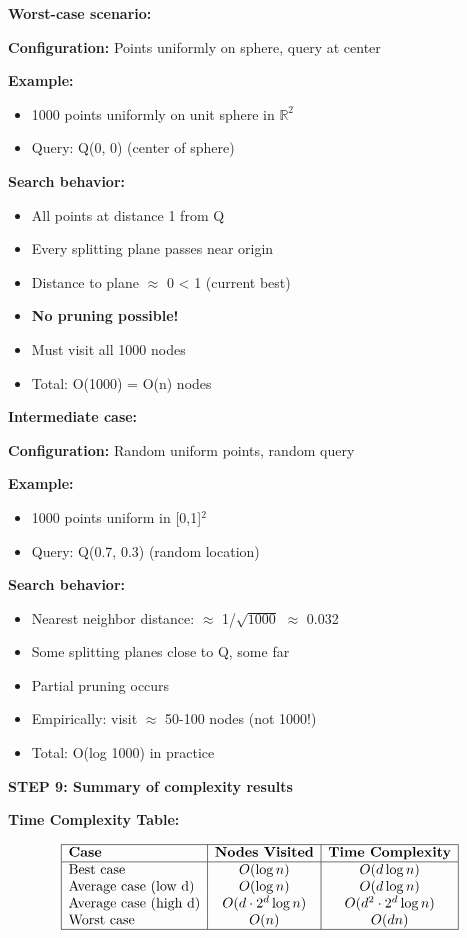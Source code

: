 \documentclass[12pt]{article}
\begin{document}
\begin{solution}
\textbf{Worst-case scenario:}

\textbf{Configuration:} Points uniformly on sphere, query at center

\textbf{Example:}
\begin{itemize}
    \item 1000 points uniformly on unit sphere in $\mathbb{R}^2$
    \item Query: Q(0, 0) (center of sphere)
\end{itemize}

\textbf{Search behavior:}
\begin{itemize}
    \item All points at distance 1 from Q
    \item Every splitting plane passes near origin
    \item Distance to plane $\approx$ 0 < 1 (current best)
    \item \textbf{No pruning possible!}
    \item Must visit all 1000 nodes
    \item Total: O(1000) = O(n) nodes \checkmark
\end{itemize}

\textbf{Intermediate case:}

\textbf{Configuration:} Random uniform points, random query

\textbf{Example:}
\begin{itemize}
    \item 1000 points uniform in [0,1]$^2$
    \item Query: Q(0.7, 0.3) (random location)
\end{itemize}

\textbf{Search behavior:}
\begin{itemize}
    \item Nearest neighbor distance: $\approx$ 1/$\sqrt{1000}$ $\approx$ 0.032
    \item Some splitting planes close to Q, some far
    \item Partial pruning occurs
    \item Empirically: visit $\approx$ 50-100 nodes (not 1000!)
    \item Total: O(log 1000) in practice \checkmark
\end{itemize}

\textbf{STEP 9: Summary of complexity results}

\textbf{Time Complexity Table:}

\[
\begin{array}{|l|c|c|}
\hline
\textbf{Case} & \textbf{Nodes Visited} & \textbf{Time Complexity} \\
\hline
\text{Best case} & O(\log n) & O(d \log n) \\
\text{Average case (low d)} & O(\log n) & O(d \log n) \\
\text{Average case (high d)} & O(d \cdot 2^d \log n) & O(d^2 \cdot 2^d \log n) \\
\text{Worst case} & O(n) & O(dn) \\
\hline
\end{array}
\]


\end{solution}
\end{document}
